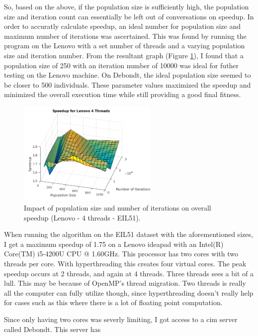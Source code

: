 \documentclass[10pt,letterpaper]{article}
\begin{document}
So, based on the above, if the population size is sufficiently high, the population size and iteration count can essentially be left out of conversations on speedup. In order to accuratly calculate speedup, an ideal number for population size and maximum number of iterations was ascertained. This was found by running the program on the Lenovo with a set number of threads and a varying population size and iteration number. From the resultant graph (Figure 
\ref{fig:popvsiter}), I found that a population size of 250 with an iteration number of 10000 was ideal for futher testing on the Lenovo machine. On Debondt, the ideal population size seemed to be closer to 500 individuals. These parameter values maximized the speedup and minimized the overall execution time while still providing a good final fitness. 

\begin{figure}
\centering
\includegraphics[width=0.6\textwidth]{../img/Lenovo_4Thread_PopvsIter.png} 
\caption{Impact of population size and number of iterations on overall speedup (Lenovo - 4 threads - EIL51).}
\label{fig:popvsiter}
\end{figure}

When running the algorithm on the EIL51 dataset with the aforementioned sizes, I get a maximum speedup of 1.75 on a Lenovo ideapad with an Intel(R) Core(TM) i5-4200U CPU @ 1.60GHz. This processor has two cores with two threads per core. With hyperthreading this creates four virtual cores. The peak speedup occurs at 2 threads, and again at 4 threads. Three threads sees a bit of a lull. This may be because of OpenMP's thread migration. Two threads is really all the computer can fully utilize though, since hyperthreading doesn't really help for cases such as this where there is a lot of floating point computation. %

Since only having two cores was severly limiting, I got access to a cim server called Debondt. This server has %
\end{document}

